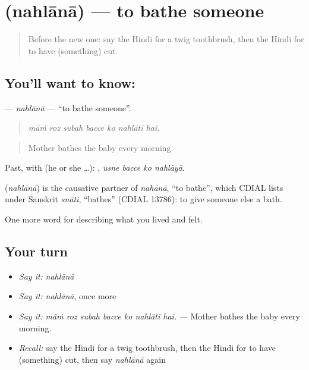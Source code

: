 \section[\texorpdfstring{\hi{नहलाना} (nahlānā)}{नहलाना (nahlānā)}]{ (nahlānā) — to bathe someone}

\label{lesson:HI-C484-nahlana}



\begin{quote}
Before the new one: say the Hindi for a twig toothbrush, then the Hindi for to have (something) cut.
\end{quote}

\subsection*{You'll want to know: }
\textbf{} — \emph{nahlānā} — \textquotedblleft{}to bathe someone\textquotedblright{}.

\begin{quote}
      
\end{quote}

\begin{quote}
\emph{māṁ roz subah bacce ko nahlātī hai.}
\end{quote}

\begin{quote}
Mother bathes the baby every morning.
\end{quote}

Past, with  (he or she …):    , \emph{usne bacce ko nahlāyā}.

\begin{cousinweb}
\textbf{} (\emph{nahlānā}) is the causative partner of \emph{nahānā}, \textquotedblleft{}to bathe\textquotedblright{}, which CDIAL lists under Sanskrit \emph{snāti}, \textquotedblleft{}bathes\textquotedblright{} (CDIAL 13786): to give someone else a bath.
\end{cousinweb}

\begin{grammarlens}[title={What you've built}]
One more word for describing what you lived and felt.
\end{grammarlens}

\subsection*{Your turn}
\begin{itemize}
\raggedright
  \item \emph{Say it:} \emph{nahlānā}
  \item \emph{Say it:} \emph{nahlānā}, once more
  \item \emph{Say it:} \emph{māṁ roz subah bacce ko nahlātī hai.} — Mother bathes the baby every morning.
  \item \emph{Recall:} say the Hindi for a twig toothbrush, then the Hindi for to have (something) cut, then say \emph{nahlānā} again
\end{itemize}

